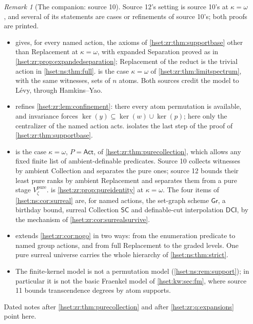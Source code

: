 \documentclass[11pt,letterpaper]{article}
\theoremstyle{definition}
\theoremstyle{remark}
\newtheorem{remark}[remark]{Remark}\aliascntresetthe{remark}
\newcommand{\Gr}{\mathsf{Gr}}
\newcommand{\SC}{\mathsf{SC}}
\newcommand{\DCI}{\mathsf{DCI}}
\newcommand{\kerat}{\operatorname{ker}}
\newcommand{\Act}{\mathsf{Act}}
\begin{document}
\begin{remark}[The companion: source 10]
\label{hset:ns:rem:companion}
Source 12's setting is source 10's at $\kappa=\omega$, and several of its
statements are cases or refinements of source 10's; both proofs are printed.
\begin{itemize}
\item {} gives, for every named action, the axioms of
\cref{hset:zr:thm:supportbase} other than Replacement at $\kappa=\omega$, with
expanded Separation proved as in \cref{hset:zr:prop:expandedseparation};
Replacement of the reduct is the trivial action in \cref{hset:ns:thm:full}.
 is the
case $\kappa=\omega$ of \cref{hset:zr:thm:limitspectrum}, with the same
witnesses, sets of $n$ atoms. Both sources credit the model to L\'evy, through
Hamkins--Yao.
\item {} refines \cref{hset:zr:lem:confinement}: there
every atom permutation is available, and invariance forces
$\kerat(y)\subseteq\kerat(w)\cup\kerat(p)$; here only the centralizer of the
named action acts.  isolates the last step of the
proof of \cref{hset:zr:thm:supportbase}.
\item {} is the case $\kappa=\omega$, $P=\Act$, of
\cref{hset:zr:thm:purecollection}, which allows any fixed finite list of
ambient-definable predicates. Source 10 collects witnesses by ambient Collection
and separates the pure ones; source 12 bounds their least pure ranks by ambient
Replacement and separates them from a pure stage $V^{\mathrm{pure}}_\zeta$.
 is \cref{hset:zr:prop:pureidentity} at
$\kappa=\omega$. The four items of \cref{hset:ns:cor:surreal} are, for named
actions, the set-graph scheme $\Gr$, a birthday bound, surreal Collection $\SC$
and definable-cut interpolation $\DCI$, by the mechanism of
\cref{hset:zr:cor:surrealsurvive}.
\item {} extends \cref{hset:zr:cor:nogo} in two ways:
from the enumeration predicate to named group actions, and from full
Replacement to the graded levels. One pure surreal universe carries the whole
hierarchy of \cref{hset:ns:thm:strict}.
\item The finite-kernel model is not a permutation model
(\cref{hset:ns:rem:support}); in particular it is not the basic Fraenkel model of
\cref{hset:kw:sec:fm}, where source 11 bounds transcendence degrees by atom
supports.
\end{itemize}
Dated notes after \cref{hset:zr:thm:purecollection} and after
\cref{hset:zr:q:expansions} point here.
\end{remark}
\end{document}
